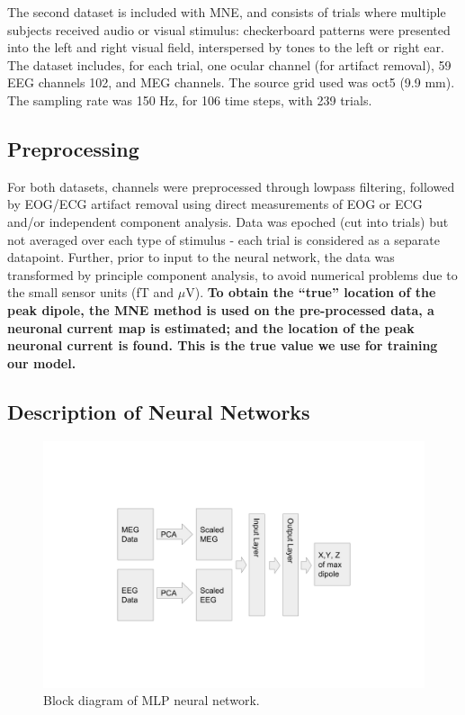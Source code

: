 \documentclass[journal,12pt,onecolumn,draftclsnofoot,]{IEEEtran}
\begin{document}
The second dataset \cite{gramfort2013meg} is included with MNE, and consists of trials where multiple subjects received audio or visual stimulus: checkerboard patterns were presented into the left and right visual field, interspersed by tones to the left or right ear. The dataset includes, for each trial, one ocular channel (for artifact removal), 59 EEG channels 102, and MEG channels. The source grid used was oct5 (9.9 mm). The sampling rate was 150 Hz, for 106 time steps, with 239 trials. 

\subsection{Preprocessing}
For both datasets, channels were preprocessed through lowpass filtering, followed by EOG/ECG artifact removal using direct measurements of EOG or ECG and/or independent component analysis. Data was epoched (cut into trials) but not averaged over each type of stimulus - each trial is considered as a separate datapoint. Further, prior to input to the neural network, the data was transformed by principle component analysis, to avoid numerical problems due to the small sensor units (fT and $\mu$V). \textbf{To obtain the ``true'' location of the peak dipole, the MNE method is used on the pre-processed data, a neuronal current map is estimated; and the location of the peak neuronal current is found. This is the true value we use for training our model.}

\subsection{Description of Neural Networks} 
\begin{figure}[h!]
\centering
\includegraphics[width=5in]{mlp}
\caption{Block diagram of MLP neural network.}
\label{fig:mlp}
\end{figure}
\end{document}

